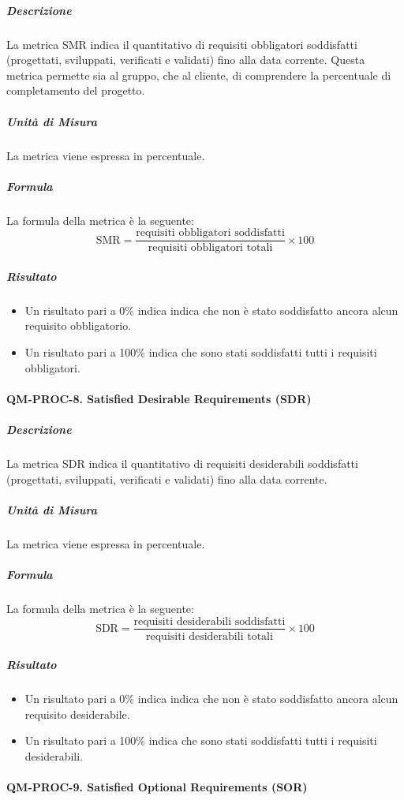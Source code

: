			\subparagraph{Descrizione}
			La metrica SMR indica il quantitativo di requisiti obbligatori soddisfatti (progettati, sviluppati, verificati e validati) fino alla data corrente. Questa metrica permette sia al gruppo, che al cliente, di comprendere la percentuale di completamento del progetto. 

			\subparagraph{Unità di Misura}
			La metrica viene espressa in percentuale.

			\subparagraph{Formula}
			La formula della metrica è la seguente:
			\[
				\text{SMR} = \frac{\text{requisiti obbligatori soddisfatti}}{\text{requisiti obbligatori totali}} \times 100
			\]

			\subparagraph{Risultato}
			\begin{itemize}
				\item Un risultato pari a 0\% indica indica che non è stato soddisfatto ancora alcun requisito obbligatorio.
				\item Un risultato pari a 100\% indica che sono stati soddisfatti tutti i requisiti obbligatori.
			\end{itemize}

		\paragraph{QM-PROC-8. Satisfied Desirable Requirements (SDR)}

			\subparagraph{Descrizione}
			La metrica SDR indica il quantitativo di requisiti desiderabili soddisfatti (progettati, sviluppati, verificati e validati) fino alla data corrente.

			\subparagraph{Unità di Misura}
			La metrica viene espressa in percentuale.

			\subparagraph{Formula}
			La formula della metrica è la seguente:
			\[
				\text{SDR} = \frac{\text{requisiti desiderabili soddisfatti}}{\text{requisiti desiderabili totali}} \times 100
			\]

			\subparagraph{Risultato}
			\begin{itemize}
				\item Un risultato pari a 0\% indica indica che non è stato soddisfatto ancora alcun requisito desiderabile.
				\item Un risultato pari a 100\% indica che sono stati soddisfatti tutti i requisiti desiderabili.
			\end{itemize}

		\paragraph{QM-PROC-9. Satisfied Optional Requirements (SOR)}

